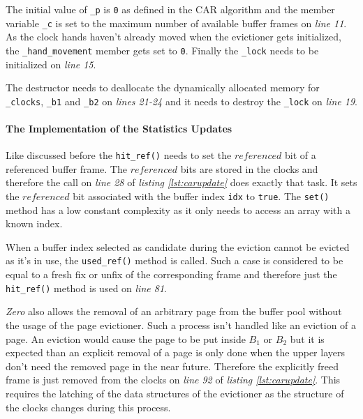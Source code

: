 	The initial value of \lstinline{_p} is \lstinline{0} as defined in the CAR algorithm and the member variable \lstinline{_c} is set to the maximum number of available buffer frames on \emph{line 11}. As the clock hands haven't already moved when the evictioner gets initialized, the \lstinline{_hand_movement} member gets set to \lstinline{0}. Finally the \lstinline{_lock} needs to be initialized on \emph{line 15}.
	
	The destructor needs to deallocate the dynamically allocated memory for \lstinline{_clocks}, \lstinline{_b1} and \lstinline{_b2} on \emph{lines 21-24} and it needs to destroy the \lstinline{_lock} on \emph{line 19}.

\paragraph{The Implementation of the Statistics Updates}

\begin{@empty}
	\lstset{
		language = [ISO]C++,
		style = basic
	}
	\begin{code}[ht!]
		\caption{Implementation of \lstinline{page_evictioner_car::hit_ref()}, \lstinline{miss_ref()}, \lstinline{used_ref()} and \lstinline{unbuffered()}} \label{lst:carupdate}
		
	\end{code}
\end{@empty}

	Like discussed before the \lstinline{hit_ref()} needs to set the $referenced$ bit of a referenced buffer frame. The $referenced$ bits are stored in the clocks and therefore the call on \emph{line 28} of \emph{listing \ref{lst:carupdate}} does exactly that task. It sets the $referenced$ bit associated with the buffer index \lstinline{idx} to \lstinline{true}. The \lstinline{set()} method has a low constant complexity as it only needs to access an array with a known index.
	
	When a buffer index selected as candidate during the eviction cannot be evicted as it's in use, the \lstinline{used_ref()} method is called. Such a case is considered to be equal to a fresh fix or unfix of the corresponding frame and therefore just the \lstinline{hit_ref()} method is used on \emph{line 81}.
	
	\emph{Zero} also allows the removal of an arbitrary page from the buffer pool without the usage of the page evictioner. Such a process isn't handled like an eviction of a page. An eviction would cause the page to be put inside $B_1$ or $B_2$ but it is expected than an explicit removal of a page is only done when the upper layers don't need the removed page in the near future. Therefore the explicitly freed frame is just removed from the clocks on \emph{line 92} of \emph{listing \ref{lst:carupdate}}. This requires the latching of the data structures of the evictioner as the structure of the clocks changes during this process.
	
